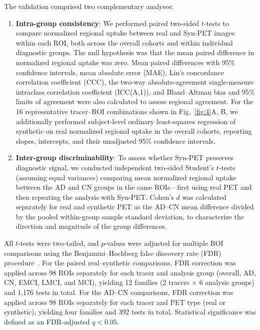 \documentclass{article}
\begin{document}
The validation comprised two complementary analyses:

\begin{enumerate}
    \item \textbf{Intra-group consistency}: We performed paired two-sided $t$-tests to compare normalized regional uptake between real and Syn-PET images within each ROI, both across the overall cohorts and within individual diagnostic groups. The null hypothesis was that the mean paired difference in normalized regional uptake was zero. Mean paired differences with 95\% confidence intervals, mean absolute error (MAE), Lin's concordance correlation coefficient (CCC), the two-way absolute-agreement single-measure intraclass correlation coefficient (ICC(A,1)), and Bland--Altman bias and 95\% limits of agreement were also calculated to assess regional agreement. For the 16 representative tracer--ROI combinations shown in Fig.~\ref{fig:4}A, B, we additionally performed subject-level ordinary least-squares regression of synthetic on real normalized regional uptake in the overall cohorts, reporting slopes, intercepts, and their unadjusted 95\% confidence intervals.

    \item \textbf{Inter-group discriminability}: To assess whether Syn-PET preserves diagnostic signal, we conducted independent two-sided Student's $t$-tests (assuming equal variances) comparing mean normalized regional uptake between the AD and CN groups in the same ROIs—first using real PET and then repeating the analysis with Syn-PET. Cohen's $d$ was calculated separately for real and synthetic PET as the AD--CN mean difference divided by the pooled within-group sample standard deviation, to characterize the direction and magnitude of the group differences.
\end{enumerate}

All $t$-tests were two-tailed, and $p$-values were adjusted for multiple ROI comparisons using the Benjamini--Hochberg false discovery rate (FDR) procedure~\cite{benjamini1995controlling}. For the paired real--synthetic comparisons, FDR correction was applied across 98 ROIs separately for each tracer and analysis group (overall, AD, CN, EMCI, LMCI, and MCI), yielding 12 families (2 tracers $\times$ 6 analysis groups) and 1,176 tests in total. For the AD--CN comparisons, FDR correction was applied across 98 ROIs separately for each tracer and PET type (real or synthetic), yielding four families and 392 tests in total. Statistical significance was defined as an FDR-adjusted $q<0.05$.
\end{document}
